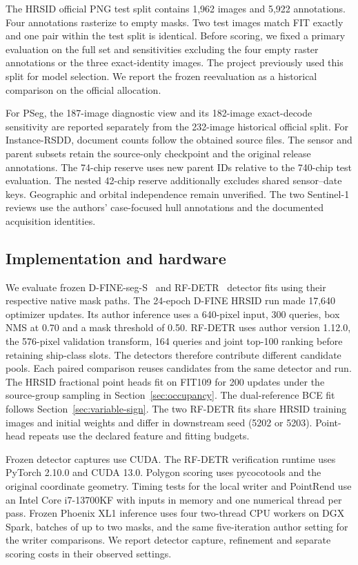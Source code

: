 \documentclass[journal]{IEEEtran}
\begin{document}
The HRSID official PNG test split contains 1,962 images and 5,922 annotations. Four annotations rasterize to empty masks. Two test images match FIT exactly and one pair within the test split is identical. Before scoring, we fixed a primary evaluation on the full set and sensitivities excluding the four empty raster annotations or the three exact-identity images. The project previously used this split for model selection. We report the frozen reevaluation as a historical comparison on the official allocation.

For PSeg, the 187-image diagnostic view and its 182-image exact-decode sensitivity are reported separately from the 232-image historical official split. For Instance-RSDD, document counts follow the obtained source files. The sensor and parent subsets retain the source-only checkpoint and the original release annotations. The 74-chip reserve uses new parent IDs relative to the 740-chip test evaluation. The nested 42-chip reserve additionally excludes shared sensor--date keys. Geographic and orbital independence remain unverified. The two Sentinel-1 reviews use the authors' case-focused hull annotations and the documented acquisition identities.

\subsection{Implementation and hardware}
We evaluate frozen D-FINE-seg-S~\cite{dfine} and RF-DETR~\cite{rfdetr} detector fits using their respective native mask paths. The 24-epoch D-FINE HRSID run made 17,640 optimizer updates. Its author inference uses a 640-pixel input, 300 queries, box NMS at 0.70 and a mask threshold of 0.50. RF-DETR uses author version 1.12.0, the 576-pixel validation transform, 164 queries and joint top-100 ranking before retaining ship-class slots. The detectors therefore contribute different candidate pools. Each paired comparison reuses candidates from the same detector and run. The HRSID fractional point heads fit on FIT109 for 200 updates under the source-group sampling in Section~\ref{sec:occupancy}. The dual-reference BCE fit follows Section~\ref{sec:variable-sign}. The two RF-DETR fits share HRSID training images and initial weights and differ in downstream seed (5202 or 5203). Point-head repeats use the declared feature and fitting budgets.

Frozen detector captures use CUDA. The RF-DETR verification runtime uses PyTorch 2.10.0 and CUDA 13.0. Polygon scoring uses pycocotools and the original coordinate geometry. Timing tests for the local writer and PointRend use an Intel Core i7-13700KF with inputs in memory and one numerical thread per pass. Frozen Phoenix XL1 inference uses four two-thread CPU workers on DGX Spark, batches of up to two masks, and the same five-iteration author setting for the writer comparisons. We report detector capture, refinement and separate scoring costs in their observed settings.
\end{document}
